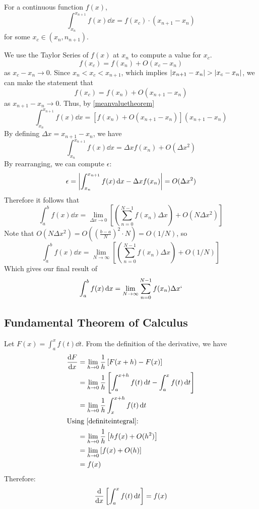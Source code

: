 \documentclass{article}
\begin{document}
	\begin{theorem}
		For a continuous function $f(x)$,
		\begin{equation}\label{meanvaluetheorem}
			\int_{x_n}^{x_{n+1}} f(x) \dd{x} = f(x_c) \cdot (x_{n+1} - x_n)
		\end{equation}
		for some $x_c\in (x_n, n_{n+1})$.
	\end{theorem}
	\noindent We use the Taylor Series of $f(x)$ at $x_n$ to compute a value for $x_c$.
	\[ f(x_c) = f(x_n) + O(x_c - x_n) \]
	as $x_c - x_n \to 0$. Since $x_n < x_c < x_{n+1}$, which implies $\abs{x_{n+1} - x_n} > \abs{x_c - x_n}$, we can make the statement that
	\[ f(x_c) = f(x_n) + O(x_{n+1} - x_n) \]
	as $x_{n+1} - x_n \to 0$. Thus, by \eqref{meanvaluetheorem}
	\[ \int_{x_n}^{x_{n+1}} f(x) \dd{x} = \left[ f(x_n) + O(x_{n+1} - x_n) \right] (x_{n+1} - x_n) \]
	By defining $\Delta x = x_{n+1} - x_n$, we have
	\begin{equation}
		\int_{x_n}^{x_{n+1}} f(x) \dd{x} = \Delta x f(x_n) + O(\Delta x ^ 2)
	\end{equation}
	By rearranging, we can compute $\epsilon$:
	\[ \epsilon = \abs{\int_{x_n}^{x_{n+1}} f(x) \dd{x} - \Delta x f(x_n)} = O(\Delta x ^ 2) \]
	Therefore it follows that
	\[ \int_{a}^{b} f(x) \dd{x} = \lim_{\Delta x \to 0} \left[ \left( \sum_{n=0}^{N-1} f(x_n) \Delta x \right) + O(N\Delta x^2) \right] \]
	Note that $O(N\Delta x^2) = O((\frac{b-a}{N})^2 \cdot N) = O(1/N)$, so
	\[ \int_{a}^{b} f(x) \dd{x} = \lim_{N \to \infty} \left[ \left( \sum_{n=0}^{N-1} f(x_n) \Delta x \right) + O(1/N) \right] \]
	Which gives our final result of
	\begin{equation}\label{definiteintegral}
		\int_{a}^{b} f(x) \dd{x} = \lim_{N \to \infty} \sum_{n=0}^{N-1} f(x_n) \Delta x`
	\end{equation}

	\subsection{Fundamental Theorem of Calculus}
	Let $F(x) = \int_{a}^{x} f(t) \dd{t}$. From the definition of the derivative, we have
	\begin{align*}
		\frac{\dd F}{\dd x} &= \lim_{h \to 0} \frac{1}{h} \left[ F(x+h) - F(x) \right] \\
		&= \lim_{h \to 0} \frac{1}{h} \left[ \int_{a}^{x+h} f(t) \dd{t} - \int_{a}^{x} f(t) \dd{t} \right] \\
		&= \lim_{h \to 0} \frac{1}{h} \int_{x}^{x+h} f(t) \dd{t} \\
		\intertext{Using \eqref{definiteintegral}:}
		&= \lim_{h \to 0} \frac{1}{h} \left[ hf(x) + O(h^2) \right] \\
		&= \lim_{h \to 0} \left[ f(x) + O(h) \right] \\
		&= f(x)
	\end{align*}
	Therefore:
	\begin{equation}\label{ftc}
		\frac{\mathrm{d}}{\dd x} \left[ \int_{a}^{x} f(t) \dd{t} \right] = f(x)
	\end{equation}
\end{document}
